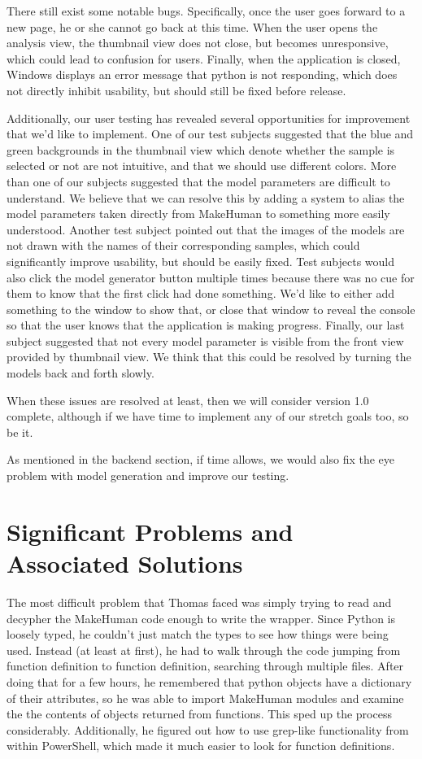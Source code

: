\documentclass[letterpaper,10pt, onecolumn, draftclsnofoot]{IEEEtran}
\begin{document}
There still exist some notable bugs. Specifically, once the user goes forward to a new page, he or she cannot go back at this time. When the user opens the analysis view, the thumbnail view does not close, but becomes unresponsive, which could lead to confusion for users. Finally, when the application is closed, Windows displays an error message that python is not responding, which does not directly inhibit usability, but should still be fixed before release.

Additionally, our user testing has revealed several opportunities for improvement that we'd like to implement. One of our test subjects suggested that the blue and green backgrounds in the thumbnail view which denote whether the sample is selected or not are not intuitive, and that we should use different colors. More than one of our subjects suggested that the model parameters are difficult to understand. We believe that we can resolve this by adding a system to alias the model parameters taken directly from MakeHuman to something more easily understood. Another test subject pointed out that the images of the models are not drawn with the names of their corresponding samples, which could significantly improve usability, but should be easily fixed. Test subjects would also click the model generator button multiple times because there was no cue for them to know that the first click had done something. We'd like to either add something to the window to show that, or close that window to reveal the console so that the user knows that the application is making progress. Finally, our last subject suggested that not every model parameter is visible from the front view provided by thumbnail view. We think that this could be resolved by turning the models back and forth slowly.

When these issues are resolved at least, then we will consider version 1.0 complete, although if we have time to implement any of our stretch goals too, so be it.

As mentioned in the backend section, if time allows, we would also fix the eye problem with model generation and improve our testing.



\section{Significant Problems and Associated Solutions}

The most difficult problem that Thomas faced was simply trying to read and decypher the MakeHuman code enough to write the wrapper. Since Python is loosely typed, he couldn't just match the types to see how things were being used. Instead (at least at first), he had to walk through the code jumping from function definition to function definition, searching through multiple files. After doing that for a few hours, he remembered that python objects have a dictionary of their attributes, so he was able to import MakeHuman modules and examine the the contents of objects returned from functions. This sped up the process considerably. Additionally, he figured out how to use grep-like functionality from within PowerShell, which made it much easier to look for function definitions.
\end{document}

